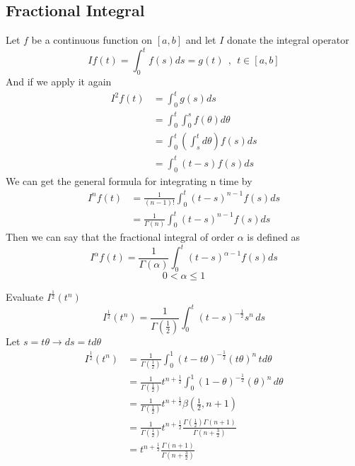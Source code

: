\documentclass[]{article}
\begin{document}
\subsection{Fractional Integral}
Let $f$ be a continuous function on $[a,b]$ and let $I$ donate the integral operator
\[
    If(t) = \int_{0}^{t}f(s)ds = g(t) \ \ , \ \ t\in[a,b]
\]
And if we apply it again
\begin{align*}
    I^{2}f(t) & = \int_{0}^{t}g(s)ds                                  \\
              & = \int_{0}^{t}\int_{0}^{s}f(\theta)d\theta            \\
              & = \int_{0}^{t} \left(\int_{s}^{t}d\theta\right)f(s)ds \\
              & = \int_{0}^{t} (t-s) f(s) ds
\end{align*}
We can get the general formula for integrating n time by
\begin{align*}
    I^{n}f(t) & = \frac{1}{(n-1)!}\int_{0}^{t}(t-s)^{n-1}f(s)ds   \\
              & =\frac{1}{\Gamma(n)}\int_{0}^{t}(t-s)^{n-1}f(s)ds
\end{align*}
Then we can say that the fractional integral of order $\alpha$ is defined as
\begin{equation}
    I^{\alpha}f(t) =\frac{1}{\Gamma(\alpha)}\int_{0}^{t}(t-s)^{\alpha-1}f(s)ds
\end{equation}
\[
    0<\alpha\leq 1
\]
\begin{example}
    Evaluate $I^{\frac{1}{2}}(t^{n})$\\
    \[
        I^{\frac{1}{2}}(t^{n}) = \frac{1}{\Gamma{(\frac{1}{2})}} \int_0^t (t-s)^{-\frac{1}{2}} s^n \, ds
    \]
    Let $s=t\theta \rightarrow ds=t d\theta$\\
    \begin{align}
        I^{\frac{1}{2}}(t^{n}) & = \frac{1}{\Gamma{(\frac{1}{2})}} \int_0^1 (t-t\theta)^{-\frac{1}{2}} (t\theta)^n \, td\theta                            \\
                               & = \frac{1}{\Gamma{(\frac{1}{2})}} t^{n+\frac{1}{2}} \int_0^1 (1-\theta)^{-\frac{1}{2}} (\theta)^n \, d\theta             \\
                               & = \frac{1}{\Gamma{(\frac{1}{2})}} t^{n+\frac{1}{2}} \beta{(\frac{1}{2},n+1)}                                             \\
                               & = \frac{1}{\Gamma{(\frac{1}{2})}} t^{n+\frac{1}{2}}\frac{\Gamma{(\frac{1}{2})\Gamma{(n+1)} } }{\Gamma{(n+\frac{3}{2})} } \\
                               & =  t^{n+\frac{1}{2}}\frac{\Gamma{(n+1)} } {\Gamma{(n+\frac{3}{2})} }                                                     \\
    \end{align}
\end{example}
\end{document}
